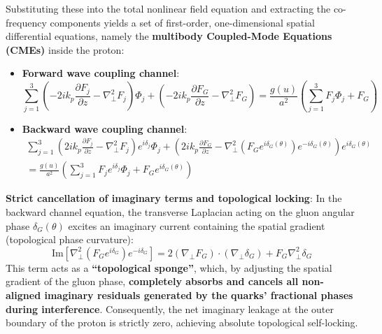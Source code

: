 \documentclass[12pt, a4paper]{article}
\begin{document}
Substituting these into the total nonlinear field equation and extracting the co-frequency components yields a set of first-order, one-dimensional spatial differential equations, namely the \textbf{multibody Coupled-Mode Equations (CMEs)} inside the proton:
\begin{itemize}
    \item \textbf{Forward wave coupling channel}:
    \begin{equation}
    \sum_{j=1}^3 \left( -2ik_p \frac{\partial F_j}{\partial z} - \nabla_\perp^2 F_j \right) \Phi_j + \left( -2ik_p \frac{\partial F_G}{\partial z} - \nabla_\perp^2 F_G \right) = \frac{g(u)}{a^2} \left( \sum_{j=1}^3 F_j \Phi_j + F_G \right) \label{eq:cme_forward}
    \end{equation}
    
    \item \textbf{Backward wave coupling channel}:
    \begin{equation}
    \begin{split}
    \sum_{j=1}^3 \left( 2ik_p \frac{\partial F_j}{\partial z} - \nabla_\perp^2 F_j \right) e^{i\delta_j} \Phi_j + \left( 2ik_p \frac{\partial F_G}{\partial z} - \nabla_\perp^2 \left( F_G e^{i\delta_G(\theta)} \right) e^{-i\delta_G(\theta)} \right) e^{i\delta_G(\theta)} \\
= \frac{g(u)}{a^2} \left( \sum_{j=1}^3 F_j e^{i\delta_j} \Phi_j + F_G e^{i\delta_G(\theta)} \right) \label{eq:cme_backward}
    \end{split}
    \end{equation}
\end{itemize}

\textbf{Strict cancellation of imaginary terms and topological locking}: In the backward channel equation, the transverse Laplacian acting on the gluon angular phase $\delta_G(\theta)$ excites an imaginary current containing the spatial gradient (topological phase curvature):
\begin{equation}
\text{Im} \left[ \nabla_\perp^2 \left( F_G e^{i\delta_G} \right) e^{-i\delta_G} \right] = 2(\nabla_\perp F_G) \cdot (\nabla_\perp \delta_G) + F_G \nabla_\perp^2 \delta_G \label{eq:im_current}
\end{equation}
This term acts as a \textbf{``topological sponge''}, which, by adjusting the spatial gradient of the gluon phase, \textbf{completely absorbs and cancels all non-aligned imaginary residuals generated by the quarks' fractional phases during interference}. Consequently, the net imaginary leakage at the outer boundary of the proton is strictly zero, achieving absolute topological self-locking.
\end{document}
